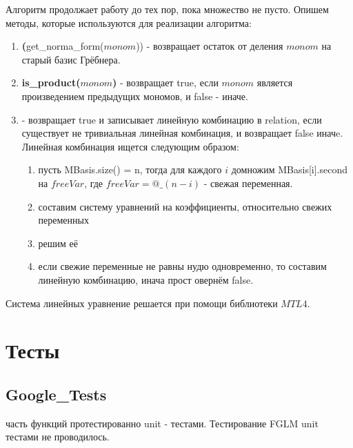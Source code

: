 \documentclass{article}
\begin{document}
Алгоритм продолжает работу до тех пор, пока множество не пусто.
\newpage
Опишем методы, которые используются для реализации алгоритма:
\begin{enumerate}
    \item \textbf(get\_norma\_form($monom$)) - возвращает остаток от деления $monom$ на старый базис Грёбнера.
    \item \textbf{is\_product($monom$)} - возвращает true, если $monom$ является произведением предыдущих мономов, и false - иначе.
    \item {} - возвращает true и записывает линейную комбинацию в relation, 
    если существует не тривиальная линейная комбинация, и возвращает false иначe. Линейная комбинация ищется следующим образом: 
    \begin{enumerate}
        \item пусть MBasis.size() = n, тогда для каждого $i$ домножим MBasis[i].second на $freeVar$, где $freeVar= @ \_ (n-i)$ - свежая переменная.
        \item составим систему уравнений на коэффициенты, относительно свежих переменных
        \item решим её
        \item если свежие переменные не равны нудю одновременно, то составим линейную комбинацию, инача прост овернём false. 
    \end{enumerate}
\end{enumerate}
Система линейных уравнение решается при помощи библиотеки $MTL4$.

\section{Тесты}
 \subsection{Google\_Tests}
  часть функций протестированно unit - тестами. Тестирование FGLM unit тестами не проводилось. 
  \newpage
\end{document}
